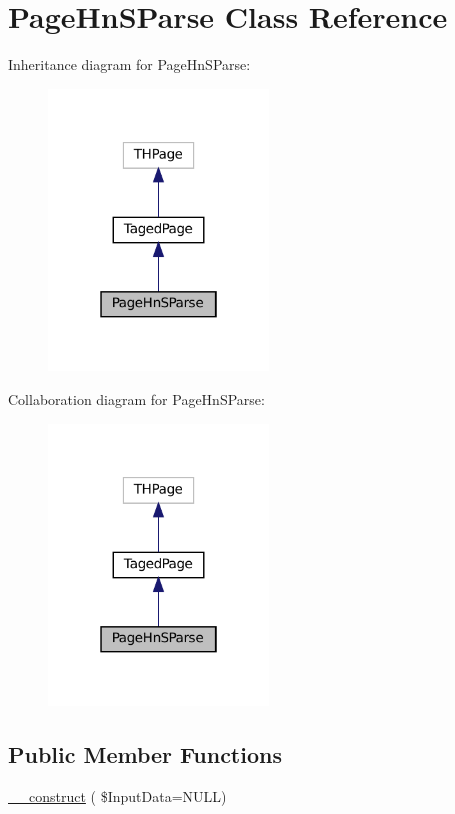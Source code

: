 \hypertarget{class_page_hn_s_parse}{}\section{Page\+Hn\+S\+Parse Class Reference}
\label{class_page_hn_s_parse}


Inheritance diagram for Page\+Hn\+S\+Parse\+:\nopagebreak
\begin{figure}[H]
\begin{center}
\leavevmode
\includegraphics[width=166pt]{class_page_hn_s_parse__inherit__graph}
\end{center}
\end{figure}


Collaboration diagram for Page\+Hn\+S\+Parse\+:\nopagebreak
\begin{figure}[H]
\begin{center}
\leavevmode
\includegraphics[width=166pt]{class_page_hn_s_parse__coll__graph}
\end{center}
\end{figure}
\subsection*{Public Member Functions}
\begin{DoxyCompactItemize}
\item 
\hyperlink{class_page_hn_s_parse_a6cde58c60a6b752d06d900d52527ae8b}{\+\_\+\+\_\+construct} ( \$Input\+Data=N\+U\+LL)
\end{DoxyCompactItemize}
